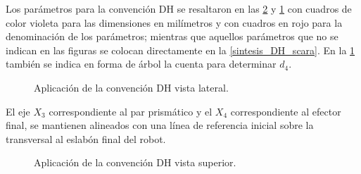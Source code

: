 \documentclass[a4paper,12pt]{article}
\begin{document}
Los parámetros para la convención DH se resaltaron en las \cref{DH_superior} y \cref{DH_lateral}
con cuadros de color violeta para las dimensiones en milímetros y con cuadros en rojo
para la denominación de los parámetros; mientras que aquellos parámetros que no se indican en las figuras
se colocan directamente en la \cref{sintesis_DH_scara}. En la \cref{DH_lateral} también se indica en forma
de árbol la cuenta para determinar $d_4$.

\begin{figure}[H]
    \centering
    \begin{adjustbox}{scale = 0.66, max width=\columnwidth}
    \end{adjustbox}
    \caption{Aplicación de la convención DH vista lateral.}
    \label{DH_lateral}
\end{figure}

El eje $X_3$ correspondiente al par prismático y el $X_4$ correspondiente al efector final, se mantienen alineados
con una línea de referencia inicial sobre la transversal al eslabón final del robot.

\begin{figure}[H]
    \centering
    \begin{adjustbox}{scale = 0.6, max width=\columnwidth}
    \end{adjustbox}
    \caption{Aplicación de la convención DH vista superior.}
    \label{DH_superior}
\end{figure}
\end{document}

